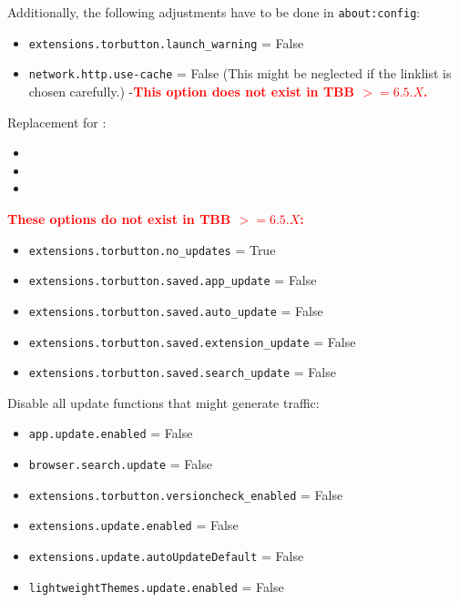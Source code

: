 \begin{description}
Additionally, the following adjustments have to be done in \texttt{about:config}:
\begin{itemize}
\item \texttt{extensions.torbutton.launch\_warning} = False
\end{itemize}
\begin{notExistingAnymore}
\begin{itemize}
\item \texttt{network.http.use-cache} = False (This might be neglected if the linklist is chosen carefully.) -\textcolor{red}{\textbf{This option does not exist in \ac{TBB} $>= 6.5.X$.}}
\end{itemize}
\end{notExistingAnymore}
Replacement for :
\begin{itemize}
\item {}
\item {}
\item {}
\end{itemize}
\textcolor{red}{\textbf{These options do not exist in \ac{TBB} $>= 6.5.X$:}}
\begin{notExistingAnymore}
\begin{itemize}
\item \texttt{extensions.torbutton.no\_updates} = True
\item \texttt{extensions.torbutton.saved.app\_update} = False
\item \texttt{extensions.torbutton.saved.auto\_update} = False
\item \texttt{extensions.torbutton.saved.extension\_update} = False
\item \texttt{extensions.torbutton.saved.search\_update} = False
\end{itemize}
\end{notExistingAnymore}
Disable all update functions that might generate traffic:
\begin{itemize}
\item \texttt{app.update.enabled} = False
\item \texttt{browser.search.update} = False
\item \texttt{extensions.torbutton.versioncheck\_enabled} = False
\item \texttt{extensions.update.enabled} = False
\item \texttt{extensions.update.autoUpdateDefault} = False
\item \texttt{lightweightThemes.update.enabled} = False

\end{itemize}
\end{description}
